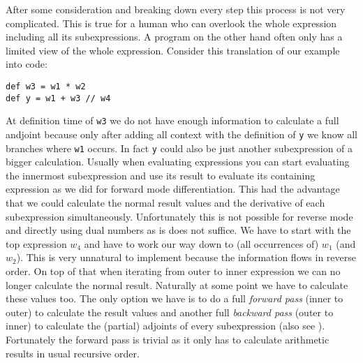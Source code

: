 After some consideration and breaking down every step this process is not very complicated. This is true for a human who can overlook the whole expression including all its subexpressions. A program on the other hand often only has a limited view of the whole expression. Consider this translation of our example into code:
\begin{lstlisting}
def w3 = w1 * w2
def y = w1 + w3 // w4
\end{lstlisting}
At definition time of \lstinline{w3} we do not have enough information to calculate a full andjoint because only after adding all context with the definition of \lstinline{y} we know all branches where \lstinline{w1} occurs. In fact \lstinline{y} could also be just another subexpression of a bigger calculation. Usually when evaluating expressions you can start evaluating the innermost subexpression and use its result to evaluate its containing expression as we did for forward mode differentiation. This had the advantage that we could calculate the normal result values and the derivative of each subexpression simultaneously. Unfortunately this is not possible for reverse mode and directly using dual numbers as is does not suffice. We have to start with the top expression $w_4$ and have to work our way down to (all occurrences of) $w_1$ (and $w_2$). This is very unnatural to implement because the information flows in reverse order. On top of that when iterating from outer to inner expression we can no longer calculate the normal result. Naturally at some point we have to calculate these values too. The only option we have is to do a full \emph{forward pass} (inner to outer) to calculate the result values and another full \emph{backward pass} (outer to inner) to calculate the (partial) adjoints of every subexpression (also see ). Fortunately the forward pass is trivial as it only has to calculate arithmetic results in usual recursive order.

